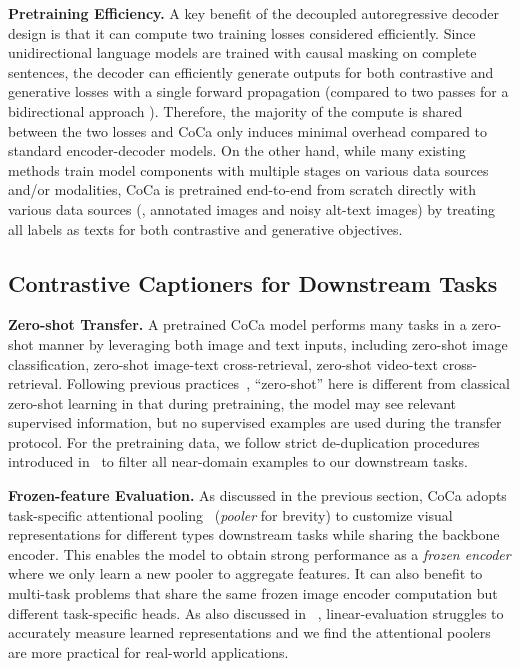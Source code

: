 \textbf{Pretraining Efficiency.}
A key benefit of the decoupled autoregressive decoder design is that it can compute two training losses considered efficiently.
Since unidirectional language models are trained with causal masking on complete sentences,
the decoder can efficiently generate outputs for both contrastive and generative losses with a single forward propagation (compared to two passes for a bidirectional approach \cite{li2021align}).
Therefore,
the majority of the compute is shared between the two losses and CoCa only induces minimal overhead compared to standard encoder-decoder models.
On the other hand, while many existing methods \cite{zhai2021lit,pham2021combined,singh2021flava,wang2021vlmo,li2021align,li2022blip} 
train model components with multiple stages on various data sources and/or modalities, CoCa is pretrained end-to-end from scratch directly with various data sources (\ie, annotated images and noisy alt-text images) by treating all labels as texts for both contrastive and generative objectives.


\subsection{Contrastive Captioners for Downstream Tasks}
\label{secs:downstream}

\textbf{Zero-shot Transfer.}
A pretrained CoCa model performs many tasks in a zero-shot manner by leveraging both image and text inputs, including zero-shot image classification, zero-shot image-text cross-retrieval, zero-shot video-text cross-retrieval. Following previous practices~\cite{radford2021learning, zhai2021lit}, ``zero-shot'' here is different from classical zero-shot learning in that during pretraining, the model may see relevant supervised information, but no supervised examples are used during the transfer protocol. For the pretraining data, we follow strict de-duplication procedures introduced in~\cite{jia2021scaling, zhai2021lit} to filter all near-domain examples to our downstream tasks.

\textbf{Frozen-feature Evaluation.}
As discussed in the previous section,
CoCa adopts task-specific attentional pooling~\cite{lee2019set} (\textit{pooler} for brevity) to customize visual representations for different types downstream tasks while sharing the backbone encoder.
This enables the model to obtain strong performance as a \textit{frozen encoder} where we only learn a new pooler to aggregate features. It can also benefit to multi-task problems that share the same frozen image encoder computation but different task-specific heads. As also discussed in ~\cite{he2021masked}, linear-evaluation struggles to accurately measure learned representations and we find the attentional poolers are more practical for real-world applications.

